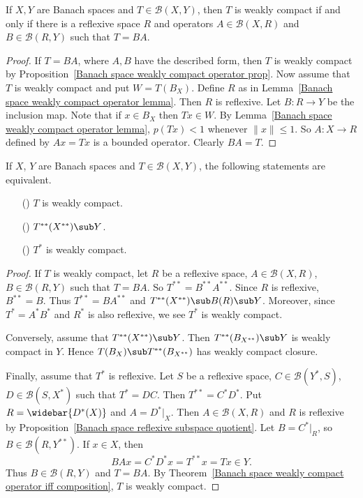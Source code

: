 \begin{theorem}\label{Banach space weakly compact operator iff composition}
If $X,Y$ are Banach spaces and $T\in\mathcal{B}(X,Y)$, then $T$ is weakly compact if and only if there is a reflexive space $R$ and operators $A\in\mathcal{B}(X,R)$ and $B\in\mathcal{B}(R,Y)$ such that $T=BA$.
\end{theorem}
\begin{proof}
If $T=BA$, where $A,B$ have the described form, then $T$ is weakly
compact by Proposition~\ref{Banach space weakly compact operator prop}. Now assume that $T$ is weakly compact and put $W=T(B_X)$. Define $R$ as in Lemma~\ref{Banach space weakly compact operator lemma}. Then $R$ is reflexive. Let $B:R\to Y$ be the inclusion map. Note that if $x\in B_X$ then $Tx\in W$. By Lemma~\ref{Banach space weakly compact operator lemma}, $p(Tx)<1$ whenever $\|x\|\leq 1$. So $A:X\to R$ defined by $Ax=Tx$ is a bounded operator. Clearly $BA=T$.
\end{proof}
\begin{proposition}
If $X$, $Y$ are Banach spaces and $T\in\mathcal{B}(X,Y)$, the following statements are equivalent.
\begin{itemize}
\item[(\rmnum{1})] $T$ is weakly compact.
\item[(\rmnum{2})] $T^{**}(X^{**})\sub Y$.
\item[(\rmnum{3})] $T^*$ is weakly compact.  
\end{itemize}
\end{proposition}
\begin{proof}
If $T$ is weakly compact, let $R$ be a reflexive space, $A\in\mathcal{B}(X,R)$, $B\in\mathcal{B}(R,Y)$ such that $T=BA$. So $T^{**}=B^{**}A^{**}$. Since $R$ is reflexive, $B^{**}=B$. Thus $T^{**}=BA^{**}$ and $T^{**}(X^{**})\sub B(R)\sub Y$.
Moreover, since $T^*=A^*B^*$ and $R^*$ is also reflexive, we see $T^*$ is weakly compact.
\par
Conversely, assume that $T^{**}(X^{**})\sub Y$. Then $T^{**}(B_{X^{**}})\sub Y$ is weakly compact in $Y$. Hence $T(B_X)\sub T^{**}(B_{X^{**}})$ has weakly compact closure.\par
Finally, assume that $T^*$ is reflexive. Let $S$ be a reflexive space, $C\in\mathcal{B}(Y^*,S)$, $D\in\mathcal{B}(S,X^*)$ such that $T^*=DC$. Then $T^{**}=C^*D^*$. Put $R=\widebar{D^*(X)}$ and $A=D^*|_X$. Then $A\in\mathcal{B}(X,R)$ and $R$ is reflexive by Proposition~\ref{Banach space reflexive subspace quotient}. Let $B=C^*|_R$, so $B\in\mathcal{B}(R,Y^{**})$. If $x\in X$, then
\[BAx=C^*D^*x=T^{**}x=Tx\in Y.\]
Thus $B\in\mathcal{B}(R,Y)$ and $T=BA$. By Theorem~\ref{Banach space weakly compact operator iff composition}, $T$ is weakly compact.
\end{proof}
